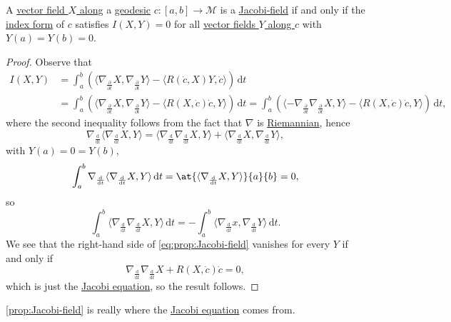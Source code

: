 \begin{proposition}\label{prop:Jacobi-field}
	A \hyperref[def:vector-field-along-curve]{vector field \(X\) along} a \hyperref[def:geodesic]{geodesic} \(c\colon [a, b] \to \mathcal{M} \) is a \hyperref[def:Jacobi-field]{Jacobi-field} if and only if the \hyperref[def:index-form]{index form} of \(c\) satisfies \(I(X, Y) = 0\) for all \hyperref[def:vector-field-along-curve]{vector fields \(Y\) along \(c\)} with \(Y(a) = Y(b) = 0\).
\end{proposition}
\begin{proof}
	Observe that
	\begin{equation}\label{eq:prop:Jacobi-field}
		\begin{split}
			I(X, Y)
			&= \int_{a}^{b} \left( \langle \nabla _{\frac{\partial }{\partial t} } X, \nabla _{\frac{\partial }{\partial t} } Y \rangle - \langle R(\dot{c} , X) Y, \dot{c} \rangle \right)  \,\mathrm{d}t\\
			&= \int_{a}^{b} \left( \langle \nabla _{\frac{\partial }{\partial t} } X, \nabla _{\frac{\partial }{\partial t} } Y \rangle - \langle R(X, \dot{c}) \dot{c}, Y \rangle \right)  \,\mathrm{d}t
			= \int_{a}^{b} \left( \langle -\nabla _{\frac{\partial }{\partial t} } \nabla _{\frac{\partial }{\partial t} } X, Y \rangle - \langle R(X, \dot{c}) \dot{c}, Y \rangle \right)  \,\mathrm{d}t,
		\end{split}
	\end{equation}
	where the second inequality follows from the fact that \(\nabla \) is \hyperref[def:Riemannian]{Riemannian}, hence
	\[
		\nabla _{\frac{\mathrm{d} }{\mathrm{d} t} } \langle \nabla _{\frac{\mathrm{d} }{\mathrm{d} t} }X, Y \rangle
		= \langle \nabla _{\frac{\mathrm{d}}{\mathrm{d}t}} \nabla _{\frac{\mathrm{d}}{\mathrm{d}t} } X, Y \rangle + \langle \nabla _{\frac{\mathrm{d}}{\mathrm{d}t} } X, \nabla _{\frac{\mathrm{d}}{\mathrm{d}t} } Y \rangle,
	\]
	with \(Y(a) = 0 = Y(b)\),
	\[
		\int_{a}^{b} \nabla _{\frac{\mathrm{d} }{\mathrm{d} t} } \langle \nabla _{\frac{\mathrm{d} }{\mathrm{d} t} }X, Y \rangle  \,\mathrm{d}t
		= \at{\langle \nabla _{\frac{\mathrm{d}}{\mathrm{d}t} } X, Y\rangle }{a}{b} = 0,
	\]
	so
	\[
		\int_{a}^{b} \langle \nabla _{\frac{\mathrm{d}}{\mathrm{d}t} } \nabla _{\frac{\mathrm{d}}{\mathrm{d}t} } X, Y\rangle  \,\mathrm{d}t
		= - \int_{a}^{b} \langle \nabla _{\frac{\mathrm{d}}{\mathrm{d}t} } x, \nabla _{\frac{\mathrm{d}}{\mathrm{d}t} } Y \rangle  \,\mathrm{d}t.
	\]
	We see that the right-hand side of \autoref{eq:prop:Jacobi-field} vanishes for every \(Y\) if and only if
	\[
		\nabla _{\frac{\mathrm{d}}{\mathrm{d}t} }\nabla _{\frac{\mathrm{d}}{\mathrm{d}t} }X + R(X, \dot{c} )\dot{c} = 0,
	\]
	which is just the \hyperref[eq:Jacobi]{Jacobi equation}, so the result follows.
\end{proof}

\begin{intuition}
	\autoref{prop:Jacobi-field} is really where the \hyperref[eq:Jacobi]{Jacobi equation} comes from.
\end{intuition}